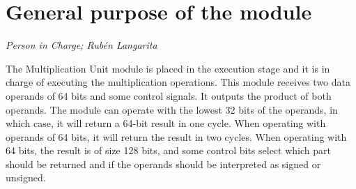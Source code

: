 \newpage
\section{General purpose of the module}
\textit{Person in Charge; Rub\'en Langarita}

The Multiplication Unit module is placed in the execution stage and it is in charge of executing the multiplication operations.
This module receives two data operands of 64 bits and some control signals.
It outputs the product of both operands.
The module can operate with the lowest 32 bits of the operands, in which case, it will return a 64-bit result in one cycle.
When operating with operands of 64 bits, it will return the result in two cycles.
When operating with 64 bits, the result is of size 128 bits, and some control bits select which part should be returned and if the operands should be interpreted as signed or unsigned.
